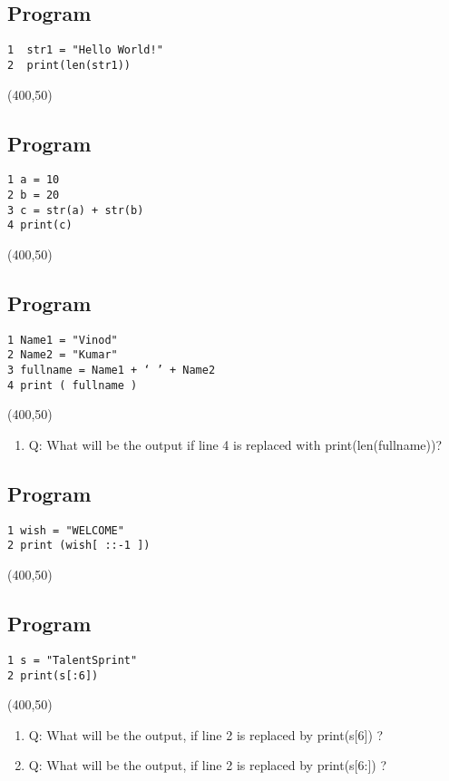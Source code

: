 \documentclass{book}
\begin{document}
\subsection{Program}
\begin{verbatim}
1  str1 = "Hello World!"
2  print(len(str1))
\end{verbatim}

\framebox(400,50){}

\subsection{Program}
\begin{verbatim}
1 a = 10
2 b = 20
3 c = str(a) + str(b)
4 print(c)
\end{verbatim}
\framebox(400,50){}

\subsection{Program}
\begin{verbatim}
1 Name1 = "Vinod"
2 Name2 = "Kumar"
3 fullname = Name1 + ‘ ’ + Name2
4 print ( fullname )
\end{verbatim}
\framebox(400,50){}

\begin{enumerate}
\item{Q: What will be the output if line 4 is replaced with print(len(fullname))?}
\end{enumerate}

\subsection{Program}
\begin{verbatim}
1 wish = "WELCOME"
2 print (wish[ ::-1 ])
\end{verbatim}
\framebox(400,50){}

\subsection{Program}
\begin{verbatim}
1 s = "TalentSprint"
2 print(s[:6])
\end{verbatim}
\framebox(400,50){}

\begin{enumerate}
\item{Q: What will be the output, if line 2 is replaced by print(s[6]) ?}
\item{Q: What will be the output, if line 2 is replaced by print(s[6:]) ?}
\end{enumerate}
\end{document}
